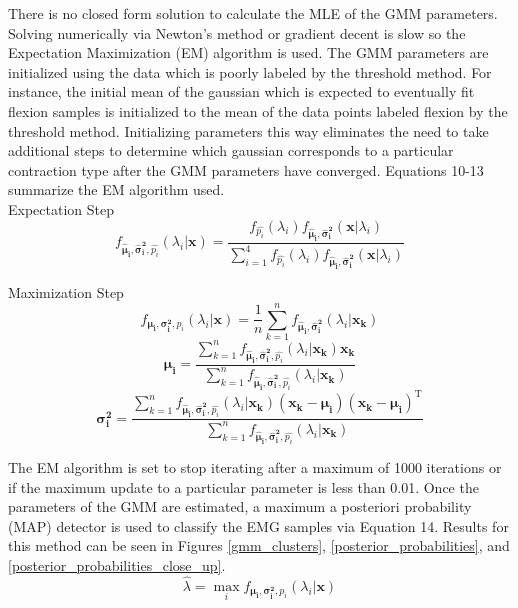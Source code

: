 \documentclass[times, 10pt,twocolumn]{article}
\begin{document}
There is no closed form solution to calculate the MLE of the GMM parameters. Solving numerically via Newton's method or gradient decent is slow so the Expectation Maximization (EM) algorithm is used. The GMM parameters are initialized using the data which is poorly labeled by the threshold method. For instance, the initial mean of the gaussian which is expected to eventually fit flexion samples is initialized to the mean of the data points labeled flexion by the threshold method. Initializing parameters this way eliminates the need to take additional steps to determine which gaussian corresponds to a particular contraction type after the GMM parameters have converged. Equations 10-13 summarize the EM algorithm used.\\

Expectation Step
\begin{equation}
f_{\mathbf{\hat{\mu}_i},\mathbf{\hat{\sigma}_i^2},\hat{p_i}}(\lambda_i|\mathbf{x}) = \frac{f_{\hat{p_i}}(\lambda_i)f_{\mathbf{\hat{\mu}_i},\mathbf{\hat{\sigma}_i^2}}(\mathbf{x}|\lambda_i)}{\sum_{i=1}^{4}f_{\hat{p_i}}(\lambda_i)f_{\mathbf{\hat{\mu}_i},\mathbf{\hat{\sigma}_i^2}}(\mathbf{x}|\lambda_i)}
\end{equation}

Maximization Step
\begin{equation}
f_{\mathbf{\mu_i},\mathbf{\sigma_i^2},p_i}(\lambda_i|\mathbf{x}) = \frac{1}{n}\sum_{k=1}^{n}f_{\mathbf{\hat{\mu}_i},\mathbf{\hat{\sigma}_i^2}}(\lambda_i|\mathbf{x_k})
\end{equation}
\begin{equation}
\mathbf{\mu_i} = \frac{\sum_{k=1}^{n}f_{\mathbf{\hat{\mu}_i},\mathbf{\hat{\sigma}_i^2},\hat{p_i}}(\lambda_i|\mathbf{x_k})\mathbf{x_k}}{\sum_{k=1}^{n}f_{\mathbf{\hat{\mu}_i},\mathbf{\hat{\sigma}_i^2},\hat{p_i}}(\lambda_i|\mathbf{x_k})}
\end{equation}
\begin{equation}
\mathbf{\sigma_i^2} = \frac{\sum_{k=1}^{n}f_{\mathbf{\hat{\mu}_i},\mathbf{\hat{\sigma}_i^2},\hat{p_i}}(\lambda_i|\mathbf{x_k})(\mathbf{x_k}-\mathbf{\mu_i})(\mathbf{x_k}-\mathbf{\mu_i})^\text{T}}{\sum_{k=1}^{n}f_{\mathbf{\hat{\mu}_i},\mathbf{\hat{\sigma}_i^2},\hat{p_i}}(\lambda_i|\mathbf{x_k})}
\end{equation}

The EM algorithm is set to stop iterating after a maximum of 1000 iterations or if the maximum update to a particular parameter is less than 0.01. Once the parameters of the GMM are estimated, a maximum a posteriori probability (MAP) detector is used to classify the EMG samples via Equation 14. Results for this method can be seen in Figures \ref{gmm_clusters}, \ref{posterior_probabilities}, and \ref{posterior_probabilities_close_up}.
\begin{equation}
\hat{\lambda} = \max_{i}f_{\mathbf{\mu_i},\mathbf{\sigma_i^2},p_i}(\lambda_i|\mathbf{x})
\end{equation}
\end{document}
